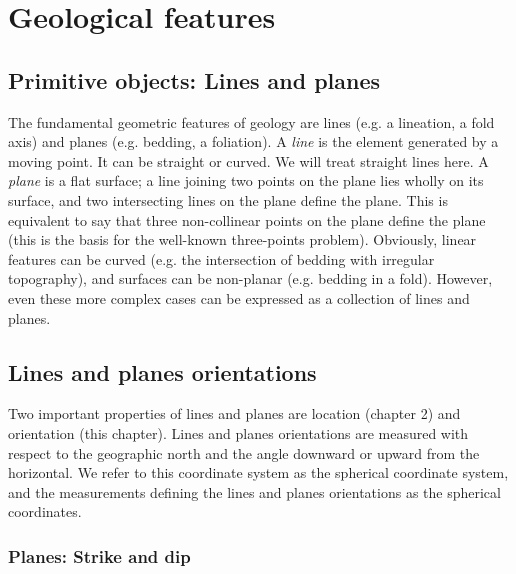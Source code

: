 \documentclass[a4paper , 12pt]{book}
\begin{document}
\chapter{Geological features}

\section{Primitive objects: Lines and planes}

The fundamental geometric features of geology are lines (e.g. a lineation, a fold axis) and planes (e.g. bedding, a foliation). A \textit{line} is the element generated by a moving point. It can be straight or curved. We will treat straight lines here. A \textit{plane} is a flat surface; a line joining two points on the plane lies wholly on its surface, and two intersecting lines on the plane define the plane. This is equivalent to say that three non-collinear points on the plane define the plane (this is the basis for the well-known three-points problem). Obviously, linear features can be curved (e.g. the intersection of bedding with irregular topography), and surfaces can be non-planar (e.g. bedding in a fold). However, even these more complex cases can be expressed as a collection of lines and planes.

\section{Lines and planes orientations}

Two important properties of lines and planes are location (chapter 2) and orientation (this chapter). Lines and planes orientations are measured with respect to the geographic north and the angle downward or upward from the horizontal. We refer to this coordinate system as the spherical coordinate system, and the measurements defining the lines and planes orientations as the spherical coordinates.

\subsection{Planes: Strike and dip}
\end{document}
